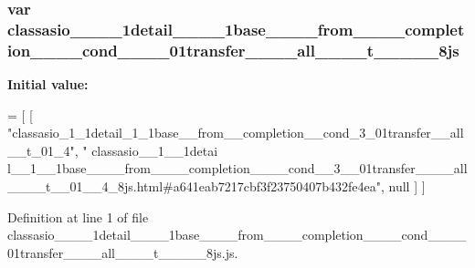 \subsubsection[{classasio\+\_\+\+\_\+1\+\_\+\+\_\+1detail\+\_\+\+\_\+1\+\_\+\+\_\+1base\+\_\+\+\_\+\+\_\+\+\_\+from\+\_\+\+\_\+\+\_\+\+\_\+completion\+\_\+\+\_\+\+\_\+\+\_\+cond\+\_\+\+\_\+3\+\_\+\+\_\+01transfer\+\_\+\+\_\+\+\_\+\+\_\+all\+\_\+\+\_\+\+\_\+\+\_\+t\+\_\+\+\_\+01\+\_\+\+\_\+4\+\_\+8js}]{\setlength{\rightskip}{0pt plus 5cm}var classasio\+\_\+\+\_\+\_\+\+\_\+1detail\+\_\+\+\_\+\_\+\+\_\+1base\+\_\+\+\_\+\+\_\+\+\_\+from\+\_\+\+\_\+\+\_\+\+\_\+completion\+\_\+\+\_\+\+\_\+\+\_\+cond\+\_\+\+\_\+\_\+\+\_\+01transfer\+\_\+\+\_\+\+\_\+\+\_\+all\+\_\+\+\_\+\+\_\+\+\_\+t\+\_\+\+\_\+\_\+\+\_\+\_\+8js}\label{classasio____1____1detail____1____1base________from________completion________cond____3____01tran425db4c17182d7ad0a8fb795dc081056_afd4e9fdf9a540d6f0d87c5386226c87e}
{\bfseries Initial value\+:}
\begin{DoxyCode}
=
[
    [ \textcolor{stringliteral}{"classasio\_1\_1detail\_1\_1base\_\_from\_\_completion\_\_cond\_3\_01transfer\_\_all\_\_t\_01\_4"}, \textcolor{stringliteral}{"
      classasio\_\_1\_\_1detai
      l\_\_1\_\_1base\_\_\_\_from\_\_\_\_completion\_\_\_\_cond\_\_3\_\_01transfer\_\_\_\_all\_\_\_\_t\_\_01\_\_4\_8js.html#a641eab7217cbf3f23750407b432fe4ea"}, null ]
]
\end{DoxyCode}


Definition at line 1 of file classasio\+\_\+\+\_\+\_\+\+\_\+1detail\+\_\+\+\_\+\_\+\+\_\+1base\+\_\+\+\_\+\+\_\+\+\_\+from\+\_\+\+\_\+\+\_\+\+\_\+completion\+\_\+\+\_\+\+\_\+\+\_\+cond\+\_\+\+\_\+\_\+\+\_\+01transfer\+\_\+\+\_\+\+\_\+\+\_\+all\+\_\+\+\_\+\+\_\+\+\_\+t\+\_\+\+\_\+\_\+\+\_\+\_\+8js.\+js.

